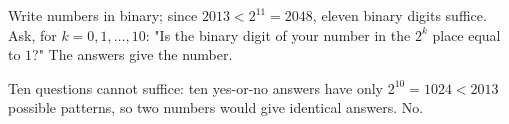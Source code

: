Write numbers in binary; since $2013<2^{11}=2048$, eleven binary digits suffice. Ask, for $k=0,1,\dots,10$: "Is the binary digit of your number in the $2^k$ place equal to $1$?" The answers give the number.

Ten questions cannot suffice: ten yes-or-no answers have only $2^{10}=1024<2013$ possible patterns, so two numbers would give identical answers. $\boxed{\text{No}}$.
